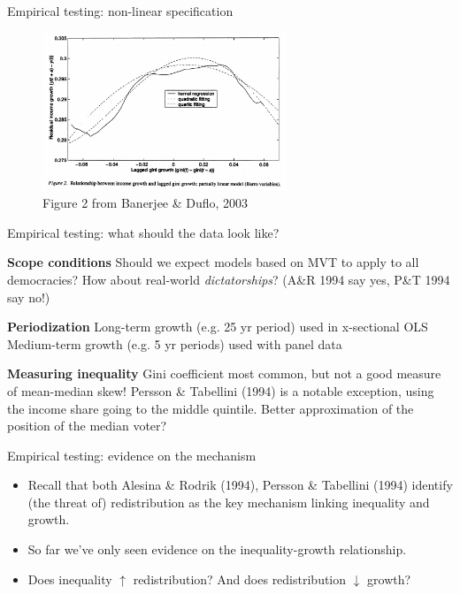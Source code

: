 \documentclass[aspectratio=169]{beamer}
\begin{document}
\begin{frame}{Empirical testing: non-linear specification}

\begin{figure}
\includegraphics[width=0.65\textwidth]{banerjee.png}
\caption*{\footnotesize{Figure 2 from Banerjee \& Duflo, 2003} }
\end{figure}

\end{frame} 
\begin{frame}{Empirical testing: what should the data look like?}

\begin{outline}

\1 \textbf{Scope conditions}
\2 Should we expect models based on MVT to apply to all democracies? \pause 
\2 How about real-world \textit{dictatorships}? \pause (A\&R 1994 say yes, P\&T 1994 say no!)

\pause 
\vspace{2em}


\1 \textbf{Periodization}
\2 Long-term growth (e.g. 25 yr period) used in x-sectional OLS
\2 Medium-term growth (e.g. 5 yr periods) used with panel data

\pause 
\vspace{2em}

\pause 
\1 \textbf{Measuring inequality}
\2 Gini coefficient most common, but not a good measure of mean-median skew!
\2 Persson \& Tabellini (1994) is a notable exception, using the income share going to the middle quintile. Better approximation of the position of the median voter?

\end{outline}

\end{frame}
\begin{frame}{Empirical testing: evidence on the mechanism}

\large 
\begin{itemize}
\item Recall that both Alesina \& Rodrik (1994), Persson 
\& Tabellini (1994) identify (the threat of) \alert{redistribution} as the key mechanism linking inequality and growth. 
\item So far we've only seen evidence on the inequality-growth relationship.
\item Does inequality $\uparrow$ redistribution? And does redistribution $\downarrow$ growth?
\end{itemize}

\end{frame}
\end{document}
